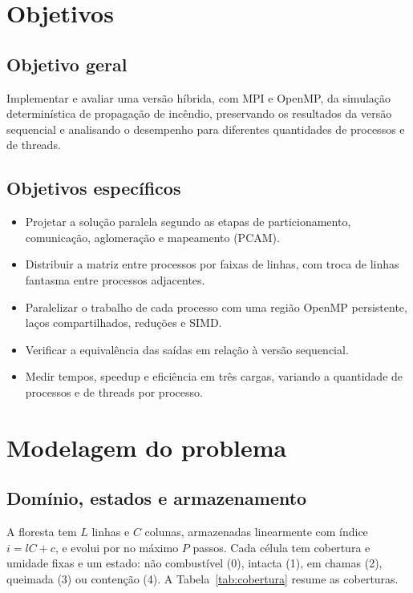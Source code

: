 \documentclass[11pt,a4paper]{article}
\begin{document}
\section{Objetivos}

\subsection{Objetivo geral}

Implementar e avaliar uma versão híbrida, com MPI e OpenMP, da simulação
determinística de propagação de incêndio, preservando os resultados da
versão sequencial e analisando o desempenho para diferentes quantidades de
processos e de threads.

\subsection{Objetivos específicos}

\begin{itemize}
\item Projetar a solução paralela segundo as etapas de particionamento,
comunicação, aglomeração e mapeamento (PCAM).
\item Distribuir a matriz entre processos por faixas de linhas, com troca de
linhas fantasma entre processos adjacentes.
\item Paralelizar o trabalho de cada processo com uma região OpenMP
persistente, laços compartilhados, reduções e SIMD.
\item Verificar a equivalência das saídas em relação à versão sequencial.
\item Medir tempos, speedup e eficiência em três cargas, variando a
quantidade de processos e de threads por processo.
\end{itemize}

\section{Modelagem do problema}\label{sec:modelagem}

\subsection{Domínio, estados e armazenamento}

A floresta tem $L$ linhas e $C$ colunas, armazenadas linearmente com índice
$i=lC+c$, e evolui por no máximo $P$ passos. Cada célula tem cobertura e
umidade fixas e um estado: não combustível (0), intacta (1), em chamas (2),
queimada (3) ou contenção (4). A Tabela~\ref{tab:cobertura} resume as
coberturas.
\end{document}
